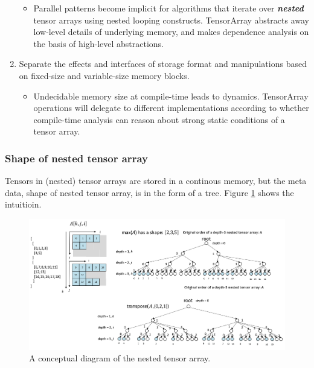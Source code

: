 \begin{enumerate}
  \begin{itemize}
    \item Parallel patterns become implicit for algorithms that iterate over \textit{\textbf{nested}} tensor arrays using nested looping constructs. TensorArray abstracts away low-level details of underlying memory, and makes dependence analysis on the basis of high-level abstractions.
  \end{itemize}

  \item Separate the effects and interfaces of storage format and manipulations based on fixed-size and variable-size memory blocks.

  \begin{itemize}
    \item Undecidable memory size at compile-time leads to dynamics. TensorArray operations will delegate to different implementations according to whether compile-time analysis can reason about strong static conditions of a tensor array.
  \end{itemize}

\end{enumerate}

\subsubsection{Shape of nested tensor array}

Tensors in (nested) tensor arrays are stored in a continous memory, but the meta data, shape of nested tensor array, is in the form of a tree. Figure \ref{nested_ta} shows the intuitioin.

\begin{figure}[htbp]
\centering
\includegraphics[width=1.\textwidth]{images/nested_tensorarray.png}
\caption{A conceptual diagram of the nested tensor array.}
\label{nested_ta}
\end{figure}
